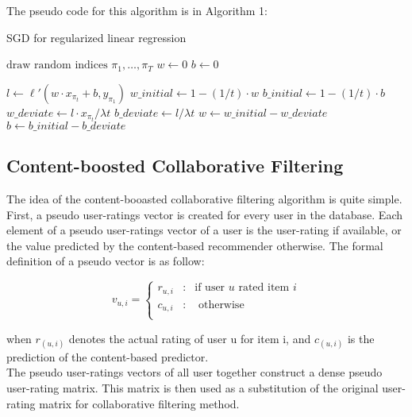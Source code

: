\noindent The pseudo code for this algorithm is in Algorithm 1:
\begin{algorithm}
\caption{SGD for regularized linear regression} \label{SGD}
\begin{algorithmic}[1]
 
	\State $\text{draw random indices } \pi_1, \dots, \pi_T$ 
	\State $w \gets 0$
	\State $b \gets 0$
	
		\State $l \gets \ell'(w \cdot x_{\pi_t} + b, y_{\pi_1})$
		\State $w\_initial \gets 1 - (1 / t) \cdot w$
		\State $b\_initial \gets 1 - (1 / t) \cdot b$
		\State $w\_deviate \gets l \cdot x_{\pi_t} / \lambda t $
		\State $b\_deviate \gets l / \lambda t$
		\State $w \gets w\_initial - w\_deviate$
		\State $b \gets b\_initial - b\_deviate$
	\EndFor
	\Return [w, b]
\EndFunction
\end{algorithmic}
\end{algorithm}

\subsection{Content-boosted Collaborative Filtering}
The idea of the content-booasted collaborative filtering algorithm is quite simple. First, a pseudo user-ratings vector is created for every user in the database. Each element of a pseudo user-ratings vector of a user is the user-rating if available, or the value predicted by the content-based recommender otherwise. The formal definition of a pseudo vector is as follow:

\begin{displaymath}
v_{u,i} = \left\{ \begin{array}{lcl} r_{u,i} & \mbox{:} & \text{if user }u \text{ rated item } i \\
c_{u,i} & \mbox{:} & \text{ otherwise} \\
\end{array} \right.
\end{displaymath}

\noindent when \( r_{(u,i)} \) denotes the actual rating of user u for item i, and \(c_{(u,i)} \) is the prediction of the content-based predictor. \\

\noindent The pseudo user-ratings vectors of all user together construct a dense pseudo user-rating matrix. This matrix is then used as a substitution of the original user-rating matrix for collaborative filtering method. \\

